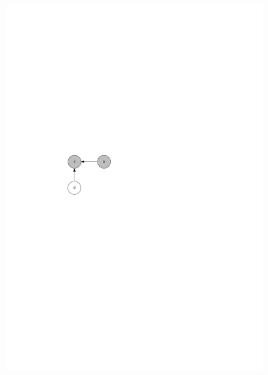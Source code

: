 \documentclass[12pt]{article}
\begin{document}
\begin{figure}
{    \includegraphics{heuristic_train.pdf}
  }
  \subfigure[Testing]{
}
\end{figure}
\end{document}
